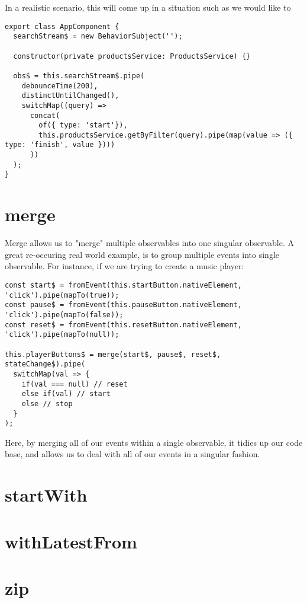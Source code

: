 In a realistic scenario, this will come up in a situation such as we would like to

\begin{lstlisting}[caption=search-bar.component.ts]
export class AppComponent {
  searchStream$ = new BehaviorSubject('');

  constructor(private productsService: ProductsService) {}

  obs$ = this.searchStream$.pipe(
    debounceTime(200),
    distinctUntilChanged(),
    switchMap((query) => 
      concat(
        of({ type: 'start'}),
        this.productsService.getByFilter(query).pipe(map(value => ({ type: 'finish', value })))
      ))
  );
}   
\end{lstlisting}

\section{merge}
Merge allows us to "merge" multiple observables into one singular observable. A
great re-occuring real world example, is to group multiple events into single 
observable. For instance, if we are trying to create a music player:
\begin{lstlisting}[caption=player-buttons.component.ts]
const start$ = fromEvent(this.startButton.nativeElement, 'click').pipe(mapTo(true));
const pause$ = fromEvent(this.pauseButton.nativeElement, 'click').pipe(mapTo(false));
const reset$ = fromEvent(this.resetButton.nativeElement, 'click').pipe(mapTo(null));

this.playerButtons$ = merge(start$, pause$, reset$, stateChange$).pipe(
  switchMap(val => {
    if(val === null) // reset 
    else if(val) // start
    else // stop
  }
);
\end{lstlisting}

Here, by merging all of our events within a single observable, it tidies up our
code base, and allows us to deal with all of our events in a singular fashion.

\section{startWith}

\section{withLatestFrom}

\section{zip}